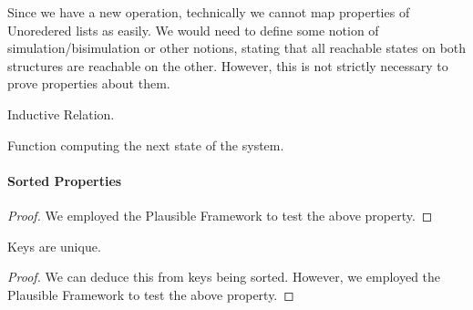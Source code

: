 Since we have a new operation, technically we cannot map properties of
Unoredered lists as easily.
%
We would need to define some notion of simulation/bisimulation or other notions,
stating that all reachable states on both structures are reachable on the other.
%
However, this is not strictly necessary to prove properties about them.


\begin{definition}
  \label{dfn:MOList.Relation.Rel}
  \leanok
  Inductive Relation.
  \end{definition}
\begin{definition}
  \label{dfn:MOList.Computation.next}
  \leanok
  Function computing the next state of the system.
  \end{definition}

\paragraph*{Sorted Properties}

\begin{theorem}
  \label{thm:MOList.Properties.key_sorted}
  \leanok
  \end{theorem}
\begin{proof}
  We employed the Plausible Framework to test the above property.
  \end{proof}

\begin{theorem}
  \label{thm:MOList.Properties.all_diff_keys}
  \leanok
  Keys are unique.
  \end{theorem}

\begin{proof}
  We can deduce this from keys being sorted.
  However, we employed the Plausible Framework to test the above property.
  \end{proof}

